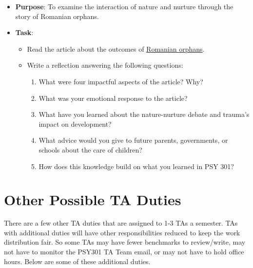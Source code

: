 \documentclass[
]{article}
\providecommand{\tightlist}{%
  \setlength{\itemsep}{0pt}\setlength{\parskip}{0pt}}
\begin{document}
\begin{itemize}
\tightlist
\item
  \textbf{Purpose}: To examine the interaction of nature and nurture through the story of Romanian orphans.\\
\item
  \textbf{Task}:

  \begin{itemize}
  \tightlist
  \item
    Read the article about the outcomes of \href{https://www.theatlantic.com/magazine/archive/2020/07/can-an-unloved-child-learn-to-love/612253/}{Romanian orphans}.\\
  \item
    Write a reflection answering the following questions:

    \begin{enumerate}
    \def\labelenumi{\arabic{enumi}.}
    \tightlist
    \item
      What were four impactful aspects of the article? Why?\\
    \item
      What was your emotional response to the article?\\
    \item
      What have you learned about the nature-nurture debate and trauma's impact on development?\\
    \item
      What advice would you give to future parents, governments, or schools about the care of children?\\
    \item
      How does this knowledge build on what you learned in PSY 301?
    \end{enumerate}
  \end{itemize}
\end{itemize}

\hypertarget{other-possible-ta-duties}{%
\section{Other Possible TA Duties}\label{other-possible-ta-duties}}

There are a few other TA duties that are assigned to 1-3 TAs a semester. TAs with additional duties will have other responsibilities reduced to keep the work distribution fair. So some TAs may have fewer benchmarks to review/write, may not have to monitor the PSY301 TA Team email, or may not have to hold office hours. Below are some of these additional duties.
\end{document}
